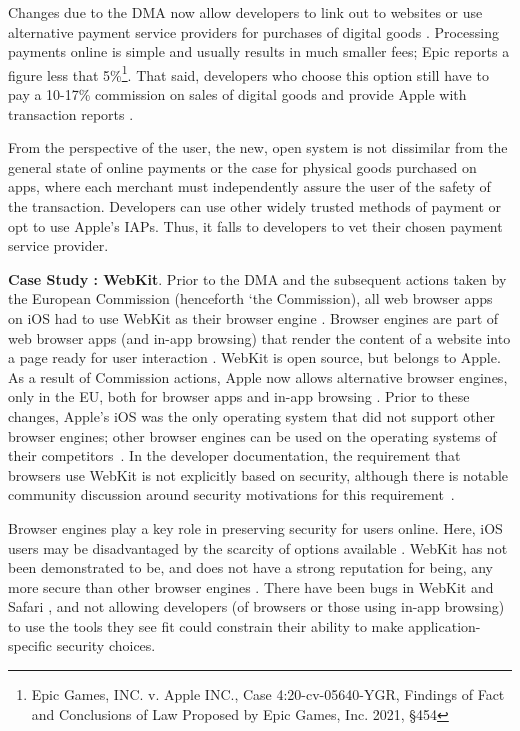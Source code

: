 \documentclass[letterpaper,twocolumn,10pt]{article}
\newcommand{\subh}[1]{\smallskip \noindent \textbf{{#1}}.}
\renewcommand{\paragraph}[1]{\subh{#1}}
\begin{document}
Changes due to the DMA now allow developers to link out to websites or use alternative payment service providers for purchases of digital goods \cite{apple_alt_payment_eu}. 
Processing payments online is simple and usually results in much smaller fees; Epic reports a figure less that 5\%\footnote{Epic Games, INC. v. Apple INC., Case 4:20-cv-05640-YGR, Findings of Fact and Conclusions of Law Proposed by Epic Games, Inc. 2021, \S 454}. That said, developers who choose this option still have to pay a 10-17\% commission on sales of digital goods and provide Apple with transaction reports \cite{apple_alt_payment_eu}.


From the perspective of the user, the new, open system is not dissimilar from the general state of online payments or the case for physical goods purchased on apps, where each merchant must independently assure the user of the safety of the transaction. Developers can use other widely trusted methods of payment or opt to use Apple's IAPs. Thus, it falls to developers to vet their chosen payment service provider.%

\paragraph{Case Study \thecasestudy: WebKit}
Prior to the DMA and the subsequent actions taken by the European Commission (henceforth `the Commission), all web browser apps on iOS had to use WebKit as their browser engine \cite{apple_webkit_requirement}.  Browser engines are part of web browser apps (and in-app browsing) that render the content of a website into a page ready for user interaction \cite{browser_sok}.  WebKit is open source, but belongs to Apple\cite{apple_webkit_owns}. As a result of Commission actions, Apple now allows alternative browser engines, only in the EU, both for browser apps and in-app browsing \cite{apple_alt_webkit}.  
Prior to these changes, Apple’s iOS was the only operating system that did not support other browser engines; other browser engines can be used on the operating systems of their competitors~\cite{team_gb_browser_engines}. In the developer documentation, the requirement that browsers use WebKit is not explicitly based on security, although there is notable community discussion around security motivations for this requirement~\cite{yes_we_cite_reddit}. 

Browser engines play a key role in preserving security for users online. Here, iOS users may be disadvantaged by the scarcity of options available \cite{browser_security}.  WebKit has not been demonstrated to be, and does not have a strong reputation for being, any more secure than other browser engines \cite{browser_security}. There have been bugs in WebKit and Safari \cite{browser_sok}, and not allowing developers (of browsers or those using in-app browsing) to use the tools they see fit could constrain their ability to make application-specific security choices.
\end{document}
